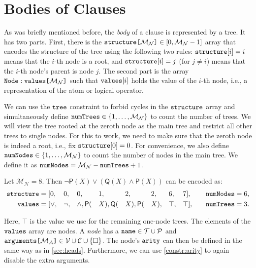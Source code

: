 \documentclass[runningheads]{llncs}
\newcommand{\variable}[1]{\texttt{\textup{#1}}}
\newcommand{\arrayd}[3]{\variable{{#1}[}{#2}\variable{]} \in {#3}}
\newcommand{\arrayt}[3]{\variable{{#3}} : \variable{{#1}[}{#2}\variable{]}}
\newcommand{\predicates}{\mathcal{P}}
\newcommand{\variables}{\mathcal{V}}
\newcommand{\constants}{\mathcal{C}}
\newcommand{\tokens}{\mathcal{T}}
\newcommand{\maxArity}{\mathcal{M}_{\mathcal{A}}}
\newcommand{\maxNumNodes}{\mathcal{M}_{\mathcal{N}}}
\begin{document}
\section{Bodies of Clauses} \label{sec:bodies}

As was briefly mentioned before, the \emph{body} of a clause is represented by a
tree. It has two parts. First, there is the
$\arrayd{structure}{\maxNumNodes{}}{[0, \maxNumNodes{} - 1]}$ array that encodes
the structure of the tree using the following two rules:
$\variable{structure}[i] = i$ means that the $i$-th node is a root, and
$\variable{structure}[i] = j$ (for $j \ne i$) means that the $i$-th node's
parent is node $j$. The second part is the array
$\arrayt{values}{\maxNumNodes{}}{Node}$ such that $\variable{values}[i]$ holds
the value of the $i$-th node, i.e., a representation of the atom or logical
operator.

We can use the $\variable{tree}$ constraint \cite{DBLP:conf/cp/FagesL11} to
forbid cycles in the $\variable{structure}$ array and simultaneously define
$\variable{numTrees} \in \{ 1, \dots, \maxNumNodes{} \}$ to count the number of
trees. We will view the tree rooted at the zeroth node as the main tree and
restrict all other trees to single nodes. For this to work, we need to make sure
that the zeroth node is indeed a root, i.e., fix $\variable{structure}[0] = 0$.
For convenience, we also define $\variable{numNodes} \in \{ 1, \dots,
\maxNumNodes{} \}$ to count the number of nodes in the main tree. We define it
as $\variable{numNodes} = \maxNumNodes{} - \variable{numTrees} + 1$.

\begin{example} \label{example:formula}
  Let $\maxNumNodes{} = 8$. Then $\neg\mathsf{P}(X) \lor (\mathsf{Q}(X) \land
  \mathsf{P}(X))$ can be encoded as:
  \begin{alignat*}{9}
    \variable{structure} &= [0, &&0, &&0, &&1, &&2, &&2, &&6, &&7], \quad
    &&\variable{numNodes} = 6, \\
    \variable{values} &= [{\lor}, &&{\neg}, &&{\land}, \mathsf{P}(&&X),
    \mathsf{Q}(&&X), \mathsf{P}(&&X), &&\top, &&\top], \quad
    &&\variable{numTrees} = 3.
  \end{alignat*}
\end{example}

Here, $\top$ is the value we use for the remaining one-node trees. The
elements of the $\variable{values}$ array are nodes. A \emph{node} has a
$\variable{name} \in \tokens{} \cup \predicates{}$ and
$\arrayd{arguments}{\maxArity{}}{\variables{} \cup \constants{} \cup \{ \Box
  \}}$. The node's $\variable{arity}$ can then be defined in the same way as in
\cref{sec:heads}. Furthermore, we can use \cref{constr:arity} to again disable
the extra arguments.
\end{document}

